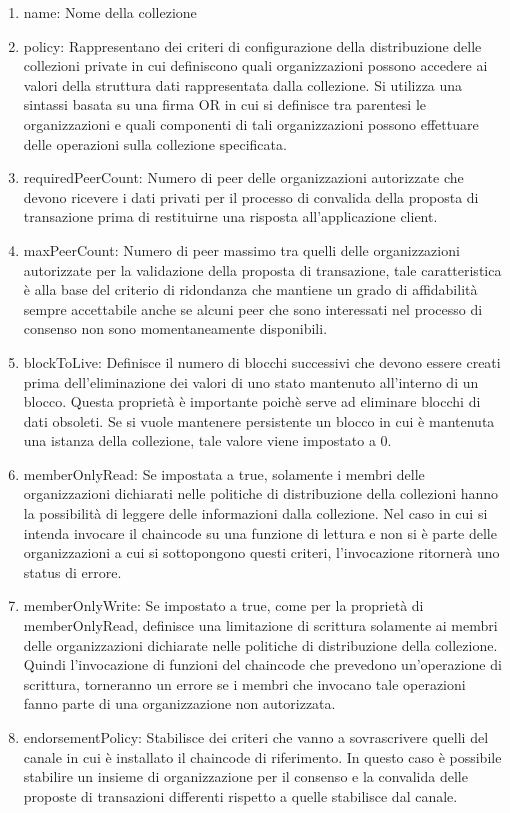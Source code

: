 \begin{enumerate}
     \item name: Nome della collezione
    \item policy: Rappresentano dei criteri di configurazione della distribuzione delle collezioni private in cui definiscono quali organizzazioni possono accedere ai valori della struttura dati rappresentata dalla collezione. Si utilizza una sintassi basata su una firma OR in cui si definisce tra parentesi le organizzazioni e quali componenti di tali organizzazioni possono effettuare delle operazioni sulla collezione specificata.
    \item requiredPeerCount: Numero di peer delle organizzazioni autorizzate che devono ricevere i dati privati per il processo di convalida della proposta di transazione prima di restituirne una risposta all'applicazione client.
    \item maxPeerCount: Numero di peer massimo tra quelli delle organizzazioni autorizzate per la validazione della proposta di transazione, tale caratteristica è alla base del criterio di ridondanza che mantiene un grado di affidabilità sempre accettabile anche se alcuni peer che sono interessati nel processo di consenso non sono momentaneamente disponibili.
    \item blockToLive: Definisce il numero di blocchi successivi che devono essere creati prima dell'eliminazione dei valori di uno stato mantenuto all'interno di un blocco. Questa proprietà è importante poichè serve ad eliminare blocchi di dati obsoleti. Se si vuole mantenere persistente un blocco in cui è mantenuta una istanza della collezione, tale valore viene impostato a 0.
    \item memberOnlyRead: Se impostata a true, solamente i membri delle organizzazioni dichiarati nelle politiche di distribuzione della collezioni hanno la possibilità di leggere delle informazioni dalla collezione. Nel caso in cui si intenda invocare il chaincode su una funzione di lettura e non si è parte delle organizzazioni a cui si sottopongono questi criteri, l'invocazione ritornerà uno status di errore.
    \item memberOnlyWrite: Se impostato a true, come per la proprietà di memberOnlyRead, definisce una limitazione di scrittura solamente ai membri delle organizzazioni dichiarate nelle politiche di distribuzione della collezione. Quindi l'invocazione di funzioni del chaincode che prevedono un'operazione di scrittura, torneranno un errore se i membri che invocano tale operazioni fanno parte di una organizzazione non autorizzata.
    \item endorsementPolicy: Stabilisce dei criteri che vanno a sovrascrivere quelli del canale in cui è installato il chaincode di riferimento. In questo caso è possibile stabilire un insieme di organizzazione per il consenso e la convalida delle proposte di transazioni differenti rispetto a quelle stabilisce dal canale.
\end{enumerate}
\newpage